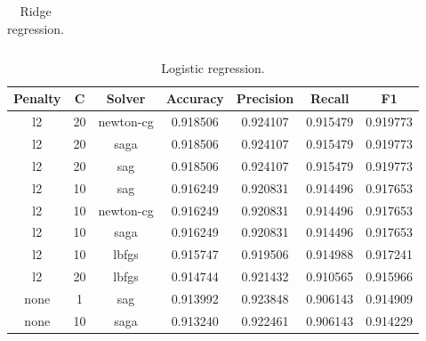 \begin{appendices}
\begin{table}
\begin{tabular*}{\textwidth}{c @{\extracolsep{\fill}} ccccc}
\end{tabular*}
\caption{\label{tab:Ridge regression}Ridge regression.}
\end{table}

\begin{table}
\begin{tabular*}{\textwidth}{c @{\extracolsep{\fill}} cccccc}

\toprule
Penalty &   C &     Solver &  Accuracy &  Precision &    Recall &        F1 \\
\midrule
     l2 &  20 &  newton-cg &  0.918506 &   0.924107 &  0.915479 &  0.919773 \\
     l2 &  20 &       saga &  0.918506 &   0.924107 &  0.915479 &  0.919773 \\
     l2 &  20 &        sag &  0.918506 &   0.924107 &  0.915479 &  0.919773 \\
     l2 &  10 &        sag &  0.916249 &   0.920831 &  0.914496 &  0.917653 \\
     l2 &  10 &  newton-cg &  0.916249 &   0.920831 &  0.914496 &  0.917653 \\
     l2 &  10 &       saga &  0.916249 &   0.920831 &  0.914496 &  0.917653 \\
     l2 &  10 &      lbfgs &  0.915747 &   0.919506 &  0.914988 &  0.917241 \\
     l2 &  20 &      lbfgs &  0.914744 &   0.921432 &  0.910565 &  0.915966 \\
   none &   1 &        sag &  0.913992 &   0.923848 &  0.906143 &  0.914909 \\
   none &  10 &       saga &  0.913240 &   0.922461 &  0.906143 &  0.914229 \\
\bottomrule

\end{tabular*}
\caption{\label{tab:Logistic regression}Logistic regression.}
\end{table}


\end{appendices}

